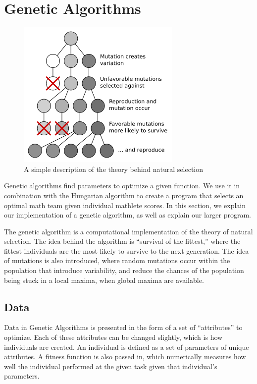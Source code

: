 \documentclass[11pt,a4paper]{article}
\begin{document}
\section{Genetic Algorithms}
\label{Genetic Algorithms}
{
\begin{figure}
  \begin{center}
	\includegraphics[scale=0.6]{natural_selection.png}
  \end{center}
  \caption{A simple description of the theory behind natural selection}
\end{figure}

Genetic algorithms find parameters to optimize a given function. We use it in combination with the Hungarian algorithm to create a program that selects an optimal math team given individual mathlete scores. In this section, we explain our implementation of a genetic algorithm, as well as explain our larger program.

The genetic algorithm is a computational implementation of the theory of natural selection. The idea behind the algorithm is ``survival of the fittest,'' where the fittest individuals are the most likely to survive to the next generation. The idea of mutations is also introduced, where random mutations occur within the population that introduce variability, and reduce the chances of the population being stuck in a local maxima, when global maxima are available.

}
\subsection{Data}
\label{Genetic Algorithms:Data}

Data in Genetic Algorithms is presented in the form of a set of ``attributes'' to optimize. Each of these attributes can be changed slightly, which is how individuals are created. An individual is defined as a set of parameters of unique attributes. A fitness function is also passed in, which numerically measures how well the individual performed at the given task given that individual's parameters.
\end{document}
